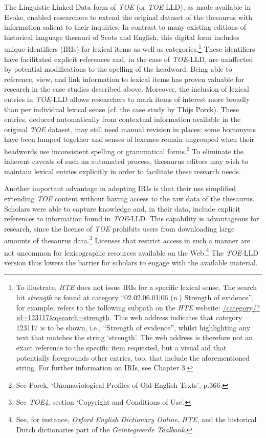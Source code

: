 The Linguistic Linked Data form of \textit{TOE} (or \textit{TOE}-LLD), as made available in Evoke, enabled researchers to extend the original dataset of the thesaurus with information salient to their inquiries. In contrast to many existing editions of historical language thesauri of Scots and English, this digital form includes unique identifiers (IRIs) for lexical items as well as categories.\footnote{To illustrate, \textit{HTE} does not issue IRIs for a specific lexical sense. The search hit \textit{strength} as found at category ``02.02.06.01|06 (n.) Strength of evidence'', for example, refers to the following subpath on the \textit{HTE} website: \url{/category/?id=123117&qsearch=strength}. This web address indicates that  category 123117 is to be shown, i.e., ``Strength of evidence'', whilst highlighting any text that matches the string `strength'. The web address is therefore not an exact reference to the specific item requested, but a visual aid that potentially foregrounds other entries, too, that include the aforementioned string. For further information on IRIs, see Chapter 3.} These identifiers have facilitated explicit references and, in the case of \textit{TOE}-LLD, are unaffected by potential modifications to the spelling of the headword. Being able to reference, view, and link information to lexical items has proven valuable for research in the case studies described above. Moreover, the inclusion of lexical entries in \textit{TOE}-LLD allows researchers to mark items of interest more broadly than per individual lexical sense (cf. the case study by Thijs Porck). 
These entries, deduced automatically from contextual information available in the original \textit{TOE} dataset, may still need manual revision in places: some homonyms have been lumped together and senses of lexemes remain ungrouped when their headwords use inconsistent spelling or grammatical forms.\footnote{See Porck, `Onomasiological Profiles of Old English Texts', p.366.} To eliminate the inherent caveats of such an automated process, thesaurus editors may wish to maintain lexical entries explicitly in order to facilitate these research needs.

Another important advantage in adopting IRIs is that their use simplified extending \textit{TOE} content without having access to the raw data of the thesaurus. Scholars were able to capture knowledge and, in their data, include explicit references to information found in \textit{TOE}-LLD. This capability is advantageous for research, since the license of \textit{TOE} prohibits users from downloading large amounts of thesaurus data.\footnote{See \textit{TOE4}, section `Copyright and Conditions of Use'.} Licenses that restrict access in such a manner are not uncommon for lexicographic resources available on the Web.\footnote{See, for instance, \textit{Oxford English Dictionary Online}, \textit{HTE}, and the historical Dutch dictionaries part of the \textit{Geïntegreerde Taalbank}.} The \textit{TOE}-LLD version thus lowers the barrier for scholars to engage with the available material.

